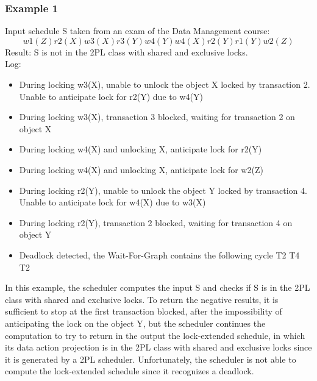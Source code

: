 \documentclass{article}
\begin{document}
\subsubsection{Example 1}
Input schedule S taken from an exam of the Data Management course: 
$$w1(Z) r2(X) w3(X) r3(Y) w4(Y) w4(X) r2(Y) r1(Y) w2(Z)$$
Result: S is not in the 2PL class with shared and exclusive locks.
\\
Log:
\begin{itemize}
    \item During locking w3(X), unable to unlock the object X locked by transaction 2. Unable to anticipate lock for r2(Y) due to w4(Y)
    \item During locking w3(X), transaction 3 blocked, waiting for transaction 2 on object X
    \item During locking w4(X) and unlocking X, anticipate lock for r2(Y)
    \item During locking w4(X) and unlocking X, anticipate lock for w2(Z)
    \item During locking r2(Y), unable to unlock the object Y locked by transaction 4. Unable to anticipate lock for w4(X) due to w3(X)
    \item During locking r2(Y), transaction 2 blocked, waiting for transaction 4 on object Y
    \item Deadlock detected, the Wait-For-Graph contains the following cycle T2 T4 T2
\end{itemize}
In this example, the scheduler computes the input S and checks if S is in the 2PL class with shared and exclusive locks. To return the negative results, it is sufficient to stop at the first transaction blocked, after the impossibility of anticipating the lock on the object Y, but the scheduler continues the computation to try to return in the output the lock-extended schedule, in which its data action projection is in the 2PL class with shared and exclusive locks since it is generated by a 2PL scheduler. Unfortunately, the scheduler is not able to compute the lock-extended schedule since it recognizes a deadlock.
\end{document}
